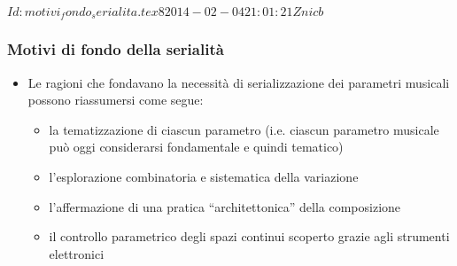 %
%
\svnInfo $Id: motivi_fondo_serialita.tex 8 2014-02-04 21:01:21Z nicb $

\setcounter{ms}{0}
\begin{frame}
    \frametitle{Motivi di fondo della serialit\`a}

    \begin{itemize}

        \item Le ragioni che fondavano la necessit\`a di serializzazione
            dei parametri musicali possono riassumersi come segue:

        \begin{itemize}

            \item la tematizzazione di ciascun parametro
                (i.e. ciascun parametro musicale
                pu\`o oggi considerarsi fondamentale
                e quindi tematico)

            \item l'esplorazione combinatoria e sistematica
                della variazione

            \item l'affermazione di una pratica ``architettonica''
                della composizione

            \item il controllo parametrico degli spazi continui
                scoperto grazie agli strumenti elettronici

        \end{itemize}

    \end{itemize}

\end{frame}
